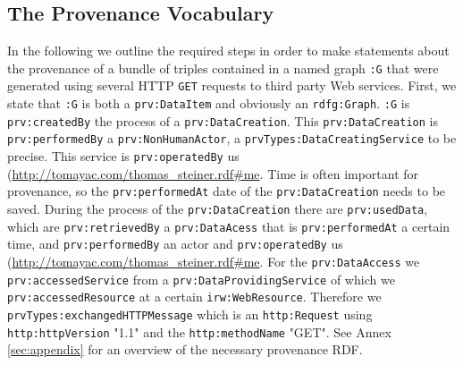 \documentclass{acm_proc_article-sp}
\begin{document}
\subsection{The Provenance Vocabulary}\label{sec:provenance}
In the following we outline the required steps in order to make statements about the provenance of a bundle of triples contained in a named graph \texttt{:G} that were generated using several HTTP \texttt{GET} requests to third party Web services. First, we state that \texttt{:G} is both a \texttt{prv:DataItem} and obviously an \texttt{rdfg:Graph}. \texttt{:G} is \texttt{prv:createdBy} the process of a \texttt{prv:DataCreation}. This \texttt{prv:DataCreation} is \texttt{prv:performedBy} a \texttt{prv:NonHumanActor}, a 
\texttt{prvTypes:DataCreatingService} to be precise. This service is \texttt{prv:operatedBy} us (\url{http://tomayac.com/thomas_steiner.rdf#me}. Time is often important for provenance, so the \texttt{prv:performedAt} date of the \texttt{prv:DataCreation} needs to be saved. During the process of the \texttt{prv:DataCreation} there are \texttt{prv:usedData}, which are \texttt{prv:retrievedBy} a \texttt{prv:DataAcess} that is \texttt{prv:performedAt} a certain time, and \texttt{prv:performedBy} an actor and \texttt{prv:operatedBy} us (\url{http://tomayac.com/thomas_steiner.rdf#me}. For the \texttt{prv:DataAccess} we \texttt{prv:accessedService} from a \texttt{prv:DataProvidingService} of which we \texttt{prv:accessedResource} at a certain \texttt{irw:WebResource}. Therefore we \texttt{prvTypes:exchangedHTTPMessage} which is an \texttt{http:Request} using \texttt{http:httpVersion} "1.1" and the \texttt{http:methodName} "GET".
See Annex \ref{sec:appendix} for an overview of the necessary provenance RDF.
\end{document}
